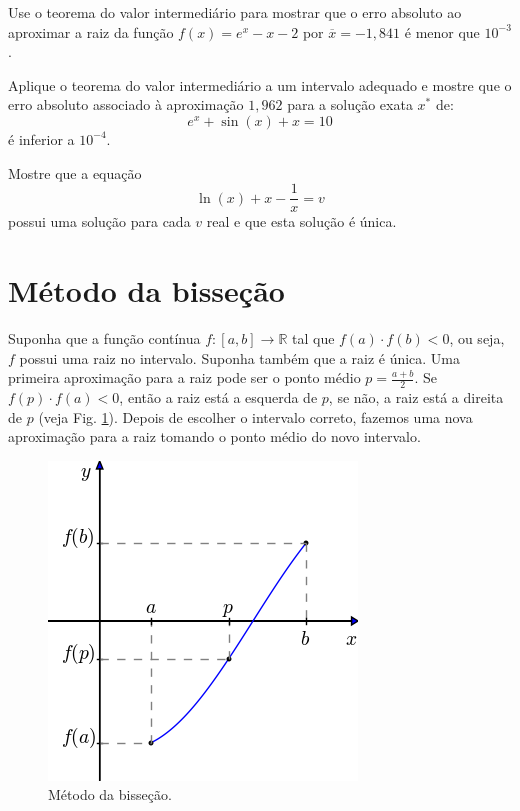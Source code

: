 \begin{Exercise} Use o teorema do valor intermediário para mostrar que o erro absoluto ao aproximar a raiz da função $f(x)=e^x-x-2$ por $\overline{x}=-1,841$ é menor que $10^{-3}$.
\end{Exercise}

\begin{Exercise} Aplique o teorema do valor intermediário a um intervalo adequado e mostre que o erro absoluto associado à aproximação $1,962$ para a solução  exata $x^*$ de:
  \begin{equation*}
    e^x+\sin (x) +x = 10  
  \end{equation*}
é inferior a $10^{-4}$.
\end{Exercise}

\begin{Exercise}\label{existe_unica} Mostre que a equação
  \begin{equation*}
    \ln(x)+x-\frac{1}{x}=v
  \end{equation*}
possui uma solução para cada $v$ real e que esta solução é única.
\end{Exercise}


\section{Método da bisseção}

Suponha que a função contínua $f:[a,b]\to\mathbb{R}$ tal que $f(a)\cdot f(b)<0$, ou seja, $f$ possui uma raiz no intervalo. Suponha também que a raiz é única. Uma primeira aproximação para a raiz pode ser o ponto médio $p=\frac{a+b}{2}$. Se $f(p)\cdot f(a)<0$, então a raiz está a esquerda de $p$, se não, a raiz está a direita de $p$ (veja Fig. \ref{fig:bisection_scheme}). Depois de escolher o intervalo correto, fazemos uma nova aproximação para a raiz tomando o ponto médio do novo intervalo.

\begin{figure}[ht]
  \centering
  \includegraphics[scale=0.5]{./cap_equacao1d/pics/metodo_da_bissecao/metodo_da_bissecao.png}
  \caption{Método da bisseção.}
  \label{fig:bisection_scheme}
\end{figure}

